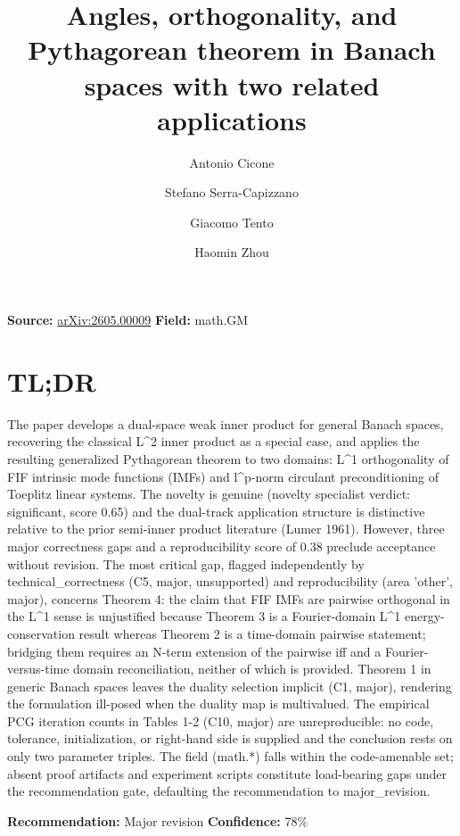 \documentclass[11pt]{article}
\title{Angles, orthogonality, and Pythagorean theorem in Banach spaces with two related applications}
\author{Antonio Cicone \and Stefano Serra-Capizzano \and Giacomo Tento \and Haomin Zhou}
\date{}
\begin{document}
\maketitle

\noindent\textbf{Source:} \href{https://arxiv.org/abs/2605.00009}{arXiv:2605.00009} \quad \textbf{Field:} math.GM\\

\section*{TL;DR}
The paper develops a dual-space weak inner product for general Banach spaces, recovering the classical L\^{}2 inner product as a special case, and applies the resulting generalized Pythagorean theorem to two domains: L\^{}1 orthogonality of FIF intrinsic mode functions (IMFs) and l\^{}p-norm circulant preconditioning of Toeplitz linear systems. The novelty is genuine (novelty specialist verdict: significant, score 0.65) and the dual-track application structure is distinctive relative to the prior semi-inner product literature (Lumer 1961). However, three major correctness gaps and a reproducibility score of 0.38 preclude acceptance without revision. The most critical gap, flagged independently by technical\_correctness (C5, major, unsupported) and reproducibility (area 'other', major), concerns Theorem 4: the claim that FIF IMFs are pairwise orthogonal in the L\^{}1 sense is unjustified because Theorem 3 is a Fourier-domain L\^{}1 energy-conservation result whereas Theorem 2 is a time-domain pairwise statement; bridging them requires an N-term extension of the pairwise iff and a Fourier-versus-time domain reconciliation, neither of which is provided. Theorem 1 in generic Banach spaces leaves the duality selection implicit (C1, major), rendering the formulation ill-posed when the duality map is multivalued. The empirical PCG iteration counts in Tables 1-2 (C10, major) are unreproducible: no code, tolerance, initialization, or right-hand side is supplied and the conclusion rests on only two parameter triples. The field (math.*) falls within the code-amenable set; absent proof artifacts and experiment scripts constitute load-bearing gaps under the recommendation gate, defaulting the recommendation to major\_revision.

\textbf{Recommendation:} Major revision \quad \textbf{Confidence:} 78\%\\
\end{document}
